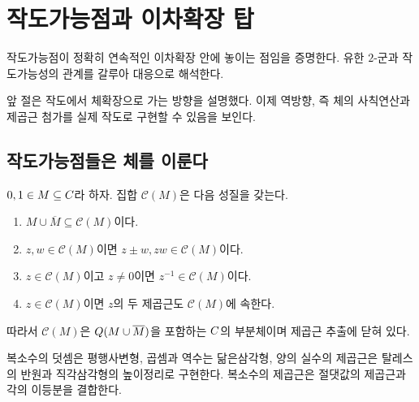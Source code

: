 \clearpage
\section{작도가능점과 이차확장 탑}
\label{sec:construction-quadratic-towers}

\begin{learninggoal}
작도가능점이 정확히 연속적인 이차확장 안에 놓이는 점임을 증명한다. 유한 $2$-군과 작도가능성의 관계를 갈루아 대응으로 해석한다.
\end{learninggoal}

앞 절은 작도에서 체확장으로 가는 방향을 설명했다. 이제 역방향, 즉 체의 사칙연산과 제곱근 첨가를 실제 작도로 구현할 수 있음을 보인다.

\subsection{작도가능점들은 체를 이룬다}

\begin{proposition}
$0,1\in M\subseteq C$라 하자. 집합 $\mathcal C(M)$은 다음 성질을 갖는다.
\begin{enumerate}[label=(\roman*)]
  \item $M\cup\overline M\subseteq\mathcal C(M)$이다.
  \item $z,w\in\mathcal C(M)$이면 $z\pm w,zw\in\mathcal C(M)$이다.
  \item $z\in\mathcal C(M)$이고 $z\ne0$이면 $z^{-1}\in\mathcal C(M)$이다.
  \item $z\in\mathcal C(M)$이면 $z$의 두 제곱근도 $\mathcal C(M)$에 속한다.
\end{enumerate}
따라서 $\mathcal C(M)$은 $Q(M\cup\overline M)$을 포함하는 $C$의 부분체이며 제곱근 추출에 닫혀 있다.
\end{proposition}

\begin{proofidea}
복소수의 덧셈은 평행사변형, 곱셈과 역수는 닮은삼각형, 양의 실수의 제곱근은 탈레스의 반원과 직각삼각형의 높이정리로 구현한다. 복소수의 제곱근은 절댓값의 제곱근과 각의 이등분을 결합한다.
\end{proofidea}

